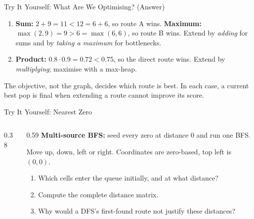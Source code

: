 \documentclass{beamer}
\begin{document}
\begin{frame}{Try It Yourself: What Are We Optimising? (Answer)}
  \begin{enumerate}
    \item \textbf{Sum:} $2+9=11<12=6+6$, so route A wins.
      \textbf{Maximum:} $\max(2,9)=9>6=\max(6,6)$, so route B wins.
      Extend by \emph{adding} for sums and by \emph{taking a maximum} for bottlenecks.
    \item \textbf{Product:} $0.8\cdot0.9=0.72<0.75$, so the direct route wins.
      Extend by \emph{multiplying}; maximise with a max-heap.
  \end{enumerate}
  \medskip
  The objective, not the graph, decides which route is best. In each case, a current best pop is final when extending a route cannot improve its score.
\end{frame}

\begin{frame}{Try It Yourself: Nearest Zero}
  \begin{columns}[c]
    \begin{column}{0.38\textwidth}
      \centering
    \end{column}
    \begin{column}{0.59\textwidth}
      \textbf{Multi-source BFS:} seed every zero at distance $0$ and run one BFS.

      Move up, down, left or right. Coordinates are zero-based, top left is $(0,0)$.
      \begin{enumerate}
        \item Which cells enter the queue initially, and at what distance?
        \item Compute the complete distance matrix.
        \item Why would a DFS's first-found route not justify these distances?
      \end{enumerate}
    \end{column}
  \end{columns}
\end{frame}
\end{document}
